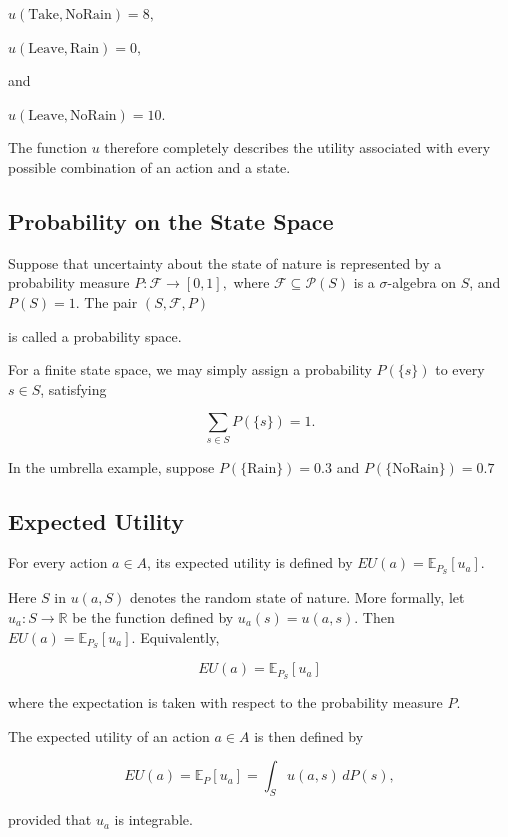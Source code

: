 \documentclass[10pt,a4paper]{book}
\begin{document}
$
    u(\mathrm{Take},\mathrm{NoRain})=8,
$

$
    u(\mathrm{Leave},\mathrm{Rain})=0,
$

and

$
    u(\mathrm{Leave},\mathrm{NoRain})=10.
$

The function \(u\) therefore completely describes the utility associated with every possible combination of an action and a state.

\subsection{Probability on the State Space}

Suppose that uncertainty about the state of nature is represented by a probability measure
$
    P:\mathcal F\longrightarrow[0,1],
$
where \(\mathcal F\subseteq\mathcal P(S)\) is a \(\sigma\)-algebra on \(S\), and
$
    P(S)=1.
$
The pair
$
    (S,\mathcal F,P)
$

is called a probability space.

For a finite state space, we may simply assign a probability \(P(\{s\})\) to every \(s\in S\), satisfying

$$
    \sum_{s\in S}P(\{s\})=1.
$$

In the umbrella example, suppose
$
    P(\{\mathrm{Rain}\})=0.3
$
and
$
    P(\{\mathrm{NoRain}\})=0.7
$

\subsection{Expected Utility}

For every action \(a\in A\), its expected utility is defined by
$
    EU(a)=\mathbb E_{P_S}[u_a].
$

Here \(S\) in \(u(a,S)\) denotes the random state of nature. More formally, let
$
    u_a:S\longrightarrow\mathbb R
$
be the function defined by
$
    u_a(s)=u(a,s).
$
Then
$
    EU(a)=\mathbb E_{P_S}[u_a].
$
Equivalently,

$$
    \boxed{
        EU(a)=\mathbb E_{P_S}[u_a]
    }
$$

where the expectation is taken with respect to the probability measure \(P\).




The expected utility of an action \(a\in A\) is then defined by

$$
    EU(a)
    =
    \mathbb{E}_{P}[u_a]
    =
    \int_S u(a,s)\,dP(s),
$$

provided that \(u_a\) is integrable.
\end{document}
